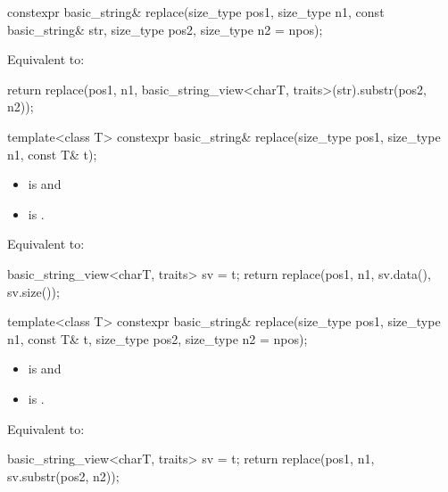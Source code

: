 %
\begin{itemdecl}
constexpr basic_string& replace(size_type pos1, size_type n1, const basic_string& str,
                                size_type pos2, size_type n2 = npos);
\end{itemdecl}

\begin{itemdescr}
\pnum
\effects
Equivalent to:
\begin{codeblock}
return replace(pos1, n1, basic_string_view<charT, traits>(str).substr(pos2, n2));
\end{codeblock}
\end{itemdescr}

%
\begin{itemdecl}
template<class T>
  constexpr basic_string& replace(size_type pos1, size_type n1, const T& t);
\end{itemdecl}

\begin{itemdescr}
\pnum
\constraints
\begin{itemize}
\item
{} is
 and
\item
{} is
.
\end{itemize}

\pnum
\effects
Equivalent to:
\begin{codeblock}
basic_string_view<charT, traits> sv = t;
return replace(pos1, n1, sv.data(), sv.size());
\end{codeblock}
\end{itemdescr}

%
\begin{itemdecl}
template<class T>
  constexpr basic_string& replace(size_type pos1, size_type n1, const T& t,
                                  size_type pos2, size_type n2 = npos);
\end{itemdecl}

\begin{itemdescr}
\pnum
\constraints
\begin{itemize}
\item
{} is
 and
\item
{} is
.
\end{itemize}

\pnum
\effects
Equivalent to:
\begin{codeblock}
basic_string_view<charT, traits> sv = t;
return replace(pos1, n1, sv.substr(pos2, n2));
\end{codeblock}
\end{itemdescr}

